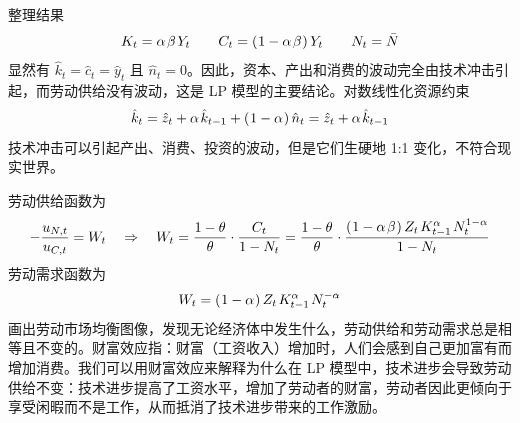 \myskip
{}

整理结果
\begin{equation*}
    K_t=\alpha\,\beta\,Y_t\qquad C_t=\bka{1-\alpha\,\beta}Y_t\qquad N_t=\bar N
\end{equation*}
显然有 \(\hat k_t=\hat c_t=\hat y_t\) 且 \(\hat n_t=0\)。因此，资本、产出和消费的波动完全由技术冲击引起，而劳动供给没有波动，这是 LP 模型的主要结论。对数线性化资源约束
\begin{equation*}
    \hat k_t=\hat z_t+\alpha\,\hat k\lt+\bka{1-\alpha}\hat n_t=\hat z_t+\alpha\,\hat k\lt
\end{equation*}
技术冲击可以引起产出、消费、投资的波动，但是它们生硬地 1:1 变化，不符合现实世界。

\myskip
{}

劳动供给函数为
\begin{equation*}
    -\dfrac{u_{N,t}}{u_{C,t}}=W_t \quad \Rightarrow\quad W_t=\frac{1-\theta}{\theta}\cdot\frac{C_t}{1-N_t}=\dfrac{1-\theta}{\theta}\cdot\frac{\bka{1-\alpha\,\beta}Z_t\,K\lt^\alpha\,N_t^{1-\alpha}}{1-N_t}
\end{equation*}
劳动需求函数为
\begin{equation*}
    W_t=\bka{1-\alpha}Z_t\,K\lt^\alpha\,N_t^{-\alpha}
\end{equation*}
画出劳动市场均衡图像，发现无论经济体中发生什么，劳动供给和劳动需求总是相等且不变的。财富效应指：财富（工资收入）增加时，人们会感到自己更加富有而增加消费。我们可以用财富效应来解释为什么在 LP 模型中，技术进步会导致劳动供给不变：技术进步提高了工资水平，增加了劳动者的财富，劳动者因此更倾向于享受闲暇而不是工作，从而抵消了技术进步带来的工作激励。
